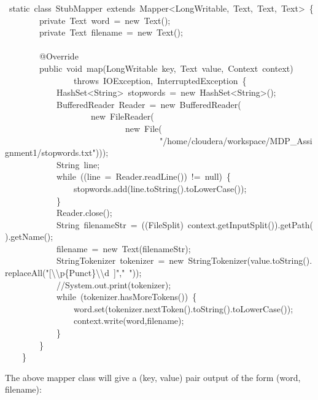 \documentclass{article}
\begin{document}
\begin{mdpre}%
~{static}~{class}~StubMapper~{extends}~Mapper\textless{}LongWritable,~Text,~Text,~Text\textgreater{}~\{\\
~~~~~~~~{private}~Text~word~=~{new}~Text();\\
~~~~~~~~{private}~Text~filename~=~{new}~Text();\\
\\
~~~~~~~~@Override\\
~~~~~~~~{public}~{void}~map(LongWritable~key,~Text~value,~Context~context)\\
~~~~~~~~~~~~~~~~{throws}~IOException,~InterruptedException~\{\\
~~~~~~~~~~~~HashSet\textless{}String\textgreater{}~stopwords~=~{new}~HashSet\textless{}String\textgreater{}();\\
~~~~~~~~~~~~BufferedReader~Reader~=~{new}~BufferedReader(\\
~~~~~~~~~~~~~~~~~~~~{new}~FileReader(\\
~~~~~~~~~~~~~~~~~~~~~~~~~~~~{new}~File(\\
~~~~~~~~~~~~~~~~~~~~~~~~~~~~~~~~~~~~{"}{/home/cloudera/workspace/MDP\_Assignment1/stopwords.txt}{"})));\\
~~~~~~~~~~~~String~line;\\
~~~~~~~~~~~~{while}~((line~=~Reader.readLine())~!=~{null})~\{\\
~~~~~~~~~~~~~~~~stopwords.add(line.{toString}().toLowerCase());\\
~~~~~~~~~~~~\}\\
~~~~~~~~~~~~Reader.close();\\
~~~~~~~~~~~~String~filenameStr~=~((FileSplit)~context.getInputSplit()).getPath().getName();~~~~~~~~~~~~\\
~~~~~~~~~~~~filename~=~{new}~Text(filenameStr);\\
~~~~~~~~~~~~StringTokenizer~tokenizer~=~{new}~StringTokenizer(value.{toString}().replaceAll({"}{[}{\textbackslash{}\textbackslash{}}{p\{Punct\}}{\textbackslash{}\textbackslash{}}{d~]}{"},{"}{~}{"}));\\
~~~~~~~~~~~~{//System.out.print(tokenizer);}\\
~~~~~~~~~~~~{while}~(tokenizer.hasMoreTokens())~\{\\
~~~~~~~~~~~~~~~~word.set(tokenizer.nextToken().{toString}().toLowerCase());~~~~\\
~~~~~~~~~~~~~~~~context.write(word,filename);\\
~~~~~~~~~~~~\}~~~~\\
~~~~~~~~\}\\
~~~~\}%
\end{mdpre}\noindent The above mapper class will give  a (key, value) pair output of the form (word, filename):
\end{document}
